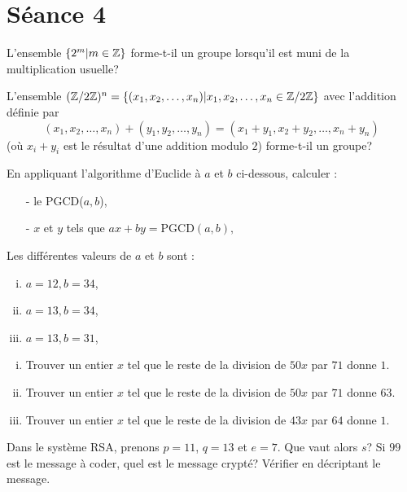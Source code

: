 
\section{S\'eance 4}

\begin{exo}
L'ensemble $\{2^m | m \in \mathbb{Z}\}$ forme-t-il un groupe lorsqu'il est muni de la multiplication usuelle?
\end{exo}

\vspace*{0.8cm}
\begin{exo}
L'ensemble $(\mathbb{Z}/2\mathbb{Z})^n=\{(x_1,x_2,\ldots,x_n)|x_1,x_2,\ldots,x_n\in \mathbb{Z}/2\mathbb{Z}\}$ avec l'addition d\'efinie par $$(x_1,x_2,\ldots,x_n)+(y_1,y_2,\ldots,y_n)=(x_1+y_1,x_2+y_2,\ldots,x_n+y_n)$$
(o\`u $x_i+y_i$ est le r\'esultat d'une addition modulo $2$) forme-t-il un groupe?
\end{exo}

\vspace*{0.8cm}
\begin{exo}
En appliquant l'algorithme d'Euclide \`a $a$ et $b$ ci-dessous, calculer :
\begin{itemize}
\item[-] le PGCD($a,b$),
\item[-] $x$ et $y$ tels que $ ax + by = \text{PGCD}(a,b),$
\end{itemize}
Les diff\'erentes valeurs de $a$ et $b$ sont :
\begin{enumerate}[(i)]
\item $a = 12, b = 34$,
\item $a = 13, b = 34$,
\item $a = 13, b = 31$,
\end{enumerate}
\end{exo}

\vspace*{0.8cm}
\begin{exo} 
\begin{enumerate}[(i)]
\item Trouver un entier $x$ tel que le reste de la division de $50x$ par $71$ donne $1$.
\item Trouver un entier $x$ tel que le reste de la division de $50x$ par $71$ donne $63$.
\item Trouver un entier $x$ tel que le reste de la division de $43x$ par $64$ donne $1$.
\end{enumerate}
\end{exo}

\vspace*{0.8cm}
\begin{exo}
Dans le syst\`eme RSA, prenons $p=11$, $q=13$ et $e=7$. Que vaut alors $s$? Si $99$ est le message \`a coder, quel est le message crypt\'e? V\'erifier en d\'ecriptant le message.
\end{exo}

\thispagestyle{empty}